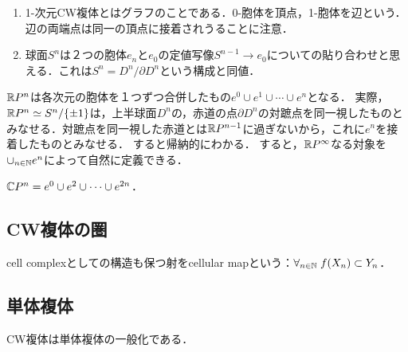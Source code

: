 \documentclass[uplatex,dvipdfmx]{jsreport}
\begin{document}
\begin{example}[自明な対象]\mbox{}
    \begin{enumerate}
        \item 1-次元CW複体とはグラフのことである．0-胞体を頂点，1-胞体を辺という．辺の両端点は同一の頂点に接着されうることに注意．
        \item 球面$S^n$は２つの胞体$e_n$と$e_0$の定値写像$S^{n-1}\to e_0$についての貼り合わせと思える．これは$S^n=D^n/\partial D^n$という構成と同値．
    \end{enumerate}
\end{example}

\begin{example}[実射影空間]
    $\mathbb{R} P^n$は各次元の胞体を１つずつ合併したもの$e^0\cup e^1\cup\cdots\cup e^n$となる．
    実際，$\mathbb{R} P^n\simeq S^n/\{\pm 1\}$は，上半球面$D^n$の，赤道の点$\partial D^n$の対蹠点を同一視したものとみなせる．対蹠点を同一視した赤道とは$\mathbb{R} P^{n-1}$に過ぎないから，これに$e^n$を接着したものとみなせる．
    すると帰納的にわかる．
    すると，$\mathbb{R} P^\infty$なる対象を$\cup_{n\in\mathbb{N}}e^n$によって自然に定義できる．
\end{example}

\begin{example}[複素射影空間]
    $\mathbb{C} P^n=e^0\cup e^2\cup\cdots\cup e^{2n}$．
\end{example}

\subsection{CW複体の圏}

\begin{definition}
    cell complexとしての構造も保つ射をcellular mapという：$\forall_{n\in\mathbb{N}}\;f(X_n)\subset Y_n$．
\end{definition}

\subsection{単体複体}

\begin{tcolorbox}[colframe=ForestGreen, colback=ForestGreen!10!white,breakable,colbacktitle=ForestGreen!40!white,coltitle=black,fonttitle=\bfseries\sffamily,
title=]
    CW複体は単体複体の一般化である．
\end{tcolorbox}
\end{document}
